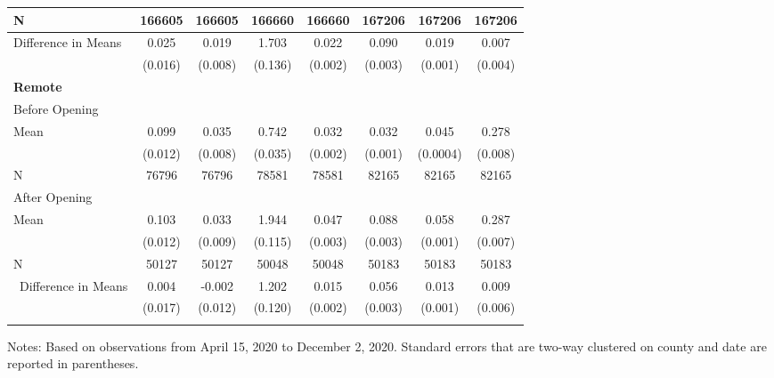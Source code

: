 \documentclass[9pt,twocolumn,twoside,lineno]{pnas-new}
\begin{document}
\begin{table}[ht]
{\begin{minipage}{\linewidth}
\begin{tabular}{@{\extracolsep{5pt}}lccccccc}
 \qquad\quad N & 166605 & 166605 & 166660 & 166660 & 167206 & 167206 & 167206 \\\hline
 \quad Difference in Means & 0.025 & 0.019 & 1.703 & 0.022 & 0.090 & 0.019 & 0.007 \\
   & (0.016) & (0.008) & (0.136) & (0.002) & (0.003) & (0.001) & (0.004) \\ \hline\hline
 \textbf{Remote} \\
 \qquad Before Opening \\
\qquad\quad Mean & 0.099 & 0.035 & 0.742 & 0.032 & 0.032 & 0.045 & 0.278 \\
   & (0.012) & (0.008) & (0.035) & (0.002) & (0.001) & (0.0004) & (0.008) \\
 \qquad\quad N & 76796 & 76796 & 78581 & 78581 & 82165 & 82165 & 82165 \\
\qquad After Opening \\
\qquad\quad Mean & 0.103 & 0.033 & 1.944 & 0.047 & 0.088 & 0.058 & 0.287 \\
   & (0.012) & (0.009) & (0.115) & (0.003) & (0.003) & (0.001) & (0.007) \\
 \qquad\quad N & 50127 & 50127 & 50048 & 50048 & 50183 & 50183 & 50183 \\\hline
\quad \ Difference in Means & 0.004 & -0.002 & 1.202 & 0.015 & 0.056 & 0.013 & 0.009 \\
   & (0.017) & (0.012) & (0.120) & (0.002) & (0.003) & (0.001) & (0.006) \\  \hline\hline \\[-1.8ex]
\end{tabular}
 \end{minipage}} 
\vspace{-0.2cm}  {\scriptsize
\begin{flushleft}
Notes:  Based on observations from April 15, 2020 to December 2, 2020. Standard errors that are two-way clustered on county and date are reported in parentheses. 
 \end{flushleft}} 
\end{table}
\end{document}

